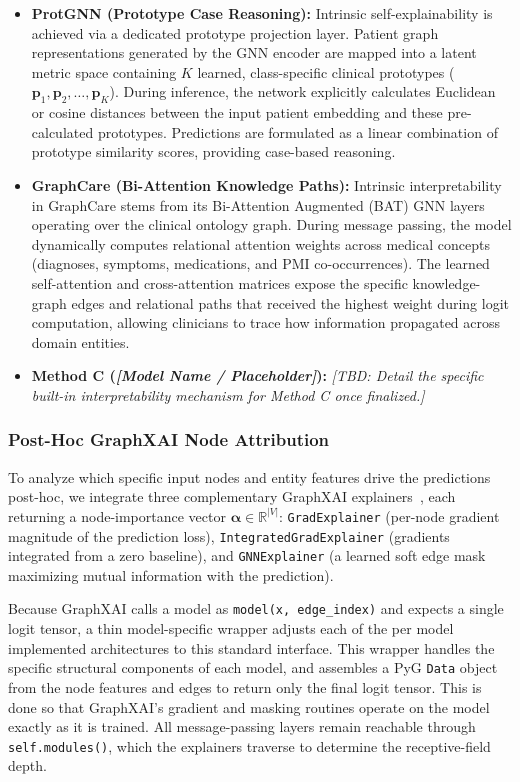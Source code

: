 \begin{itemize}
    \item \textbf{ProtGNN (Prototype Case Reasoning):} Intrinsic self-explainability is achieved via a dedicated prototype projection layer. Patient graph representations generated by the GNN encoder are mapped into a latent metric space containing $K$ learned, class-specific clinical prototypes ($\mathbf{p}_1, \mathbf{p}_2, \dots, \mathbf{p}_K$). During inference, the network explicitly calculates Euclidean or cosine distances between the input patient embedding and these pre-calculated prototypes. Predictions are formulated as a linear combination of prototype similarity scores, providing case-based reasoning.
    
    \item \textbf{GraphCare (Bi-Attention Knowledge Paths):} Intrinsic interpretability in GraphCare stems from its Bi-Attention Augmented (BAT) GNN layers operating over the clinical ontology graph. During message passing, the model dynamically computes relational attention weights across medical concepts (diagnoses, symptoms, medications, and PMI co-occurrences). The learned self-attention and cross-attention matrices expose the specific knowledge-graph edges and relational paths that received the highest weight during logit computation, allowing clinicians to trace how information propagated across domain entities.
    
    \item \textbf{Method C (\textit{[Model Name / Placeholder]}):} \textit{[TBD: Detail the specific built-in interpretability mechanism for Method C once finalized.]}
\end{itemize}

\subsubsection{Post-Hoc GraphXAI Node Attribution}
To analyze which specific input nodes and entity features drive the predictions post-hoc, we integrate three complementary GraphXAI explainers~\cite{agarwal2023graphxai}, each returning a node-importance vector
$\boldsymbol{\alpha}\in\mathbb{R}^{|V|}$: \texttt{GradExplainer} (per-node
gradient magnitude of the prediction loss), \texttt{IntegratedGradExplainer}
(gradients integrated from a zero baseline), and \texttt{GNNExplainer} (a
learned soft edge mask maximizing mutual information with the prediction).

Because GraphXAI calls a model as \texttt{model(x, edge\_index)} and expects a
single logit tensor, a thin model-specific wrapper adjusts each of the per model implemented architectures to this standard interface. This wrapper handles the specific structural components of each model, and assembles a PyG \texttt{Data} object from the node features and edges to return only the final logit tensor. This is done so that GraphXAI's gradient and masking routines operate on the model exactly as it is trained. All message-passing layers remain reachable through \texttt{self.modules()}, which the explainers traverse to determine the receptive-field depth.


